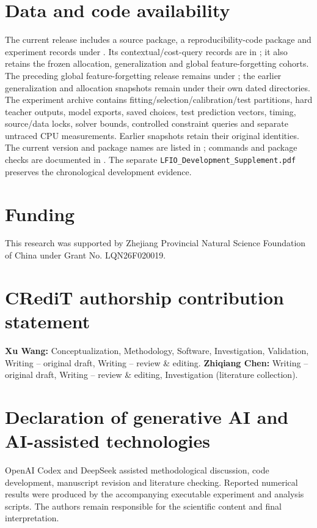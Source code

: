\documentclass[review,12pt]{elsarticle}
\begin{document}
\section*{Data and code availability}
The current release includes a source package, a reproducibility-code package and experiment records under . Its contextual/cost-query records are in ; it also retains the frozen allocation, generalization and global feature-forgetting cohorts. The preceding global feature-forgetting release remains under ; the earlier generalization and allocation snapshots remain under their own dated directories. The experiment archive contains fitting/selection/calibration/test partitions, hard teacher outputs, model exports, saved choices, test prediction vectors, timing, source/data locks, solver bounds, controlled constraint queries and separate untraced CPU measurements. Earlier snapshots retain their original identities. The current version and package names are listed in ; commands and package checks are documented in . The separate \texttt{LFIO\_Development\_Supplement.pdf} preserves the chronological development evidence.

\section*{Funding}
This research was supported by Zhejiang Provincial Natural Science Foundation
of China under Grant No. LQN26F020019.

\section*{CRediT authorship contribution statement}
\textbf{Xu Wang:} Conceptualization, Methodology, Software, Investigation,
Validation, Writing -- original draft, Writing -- review \& editing.
\textbf{Zhiqiang Chen:} Writing -- original draft, Writing -- review \& editing,
Investigation (literature collection).

\section*{Declaration of generative AI and AI-assisted technologies}
OpenAI Codex and DeepSeek assisted methodological discussion, code development, manuscript revision and literature checking. Reported numerical results were produced by the accompanying executable experiment and analysis scripts. The authors remain responsible for the scientific content and final interpretation.



\end{document}
